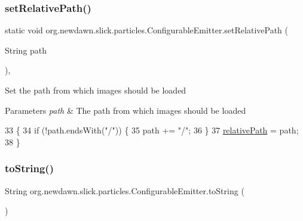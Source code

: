 \subsubsection{\texorpdfstring{set\+Relative\+Path()}{setRelativePath()}}
{\footnotesize\ttfamily static void org.\+newdawn.\+slick.\+particles.\+Configurable\+Emitter.\+set\+Relative\+Path (\begin{DoxyParamCaption}\item[{String}]{path }\end{DoxyParamCaption})\hspace{0.3cm}{\ttfamily [inline]}, {\ttfamily [static]}}

Set the path from which images should be loaded


\begin{DoxyParams}{Parameters}
{\em path} & The path from which images should be loaded \\
\hline
\end{DoxyParams}

\begin{DoxyCode}
33                                                     \{
34         \textcolor{keywordflow}{if} (!path.endsWith(\textcolor{stringliteral}{"/"})) \{
35             path += \textcolor{stringliteral}{"/"};
36         \}
37         \mbox{\hyperlink{classorg_1_1newdawn_1_1slick_1_1particles_1_1_configurable_emitter_a33ddbea65330cfe81c2a92742b1bc999}{relativePath}} = path;
38     \}
\end{DoxyCode}
\mbox{\label{classorg_1_1newdawn_1_1slick_1_1particles_1_1_configurable_emitter_a119908e4e5cb997b2b736d82dc21ada9}} 
\subsubsection{\texorpdfstring{to\+String()}{toString()}}
{\footnotesize\ttfamily String org.\+newdawn.\+slick.\+particles.\+Configurable\+Emitter.\+to\+String (\begin{DoxyParamCaption}{ }\end{DoxyParamCaption})\hspace{0.3cm}{\ttfamily [inline]}}

